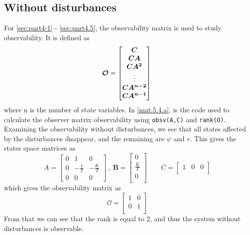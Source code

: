 \subsection{Without disturbances}
For \cref{sec:part4-1} - \cref{sec:part4.5}, the observability matrix is used to study observability. It is defined as
\begin{equation*}
  \boldsymbol{\mathcal{O}} =
  \begin{bmatrix}
    \boldsymbol{C} \\
    \boldsymbol{CA} \\
    \boldsymbol{CA^2} \\
    \vdots \\
    \boldsymbol{CA^{n-2}} \\
    \boldsymbol{CA^{n-1}} \\
  \end{bmatrix} \\
\end{equation*}
where n is the number of state variables. In \cref{mat:5.4.a}, is the code used to calculate the observer matrix observability using \texttt{obsv(A,C)} and \texttt{rank(O)}. Examining the observability without disturbances, we see that all states affected by the disturbances disappear, and the remaining are $\psi$ and $r$. This gives the states space matrices as 
\begin{equation}
    A = 
	\begin{bmatrix}
    0 & 1            & 0\\
	0 & -\frac{1}{T} & -\frac{K}{T}\\
	0 & 0            & 0
	\end{bmatrix} \ , \ \boldsymbol{B} =
  \begin{bmatrix}
	0 \\
    \frac{K}{T} \\
    0 \\
  \end{bmatrix}
  \qquad
  C =
  \begin{bmatrix}
    1 & 0 & 0\\
  \end{bmatrix}
\end{equation}
which gives the observability matrix as
\begin{equation}
  \boldsymbol{\mathcal{O}} =
  \begin{bmatrix}
    1 & 0 \\
    0 & 1 \\
  \end{bmatrix}
\end{equation}
From that we can see that the rank is equal to 2, and thus the system without disturbances is observable.

